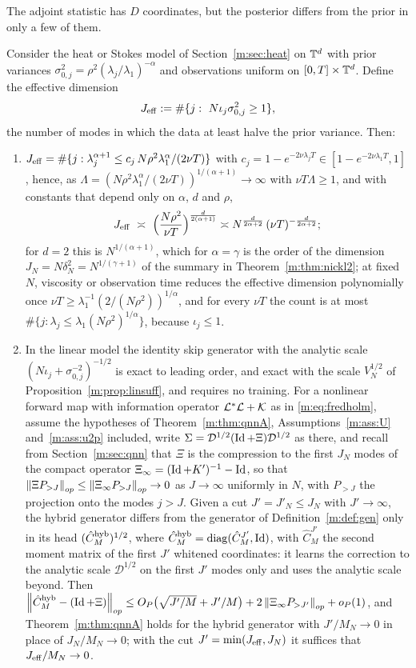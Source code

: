 The adjoint statistic has $D$ coordinates, but the posterior differs from the prior in only a few of them.

\begin{theorem}\label{m:thm:jeff}
Consider the heat or Stokes model of Section~\ref{m:sec:heat} on $\mathbb{T}^d$ with prior variances $\sigma_{0,j}^2=\rho^2(\lambda_j/\lambda_1)^{-\alpha}$ and observations uniform on $[0,T]\times\mathbb{T}^d$. Define the effective dimension
\[
J_{\rm eff}:=\#\{j:\ N\iota_j\sigma_{0,j}^2\ge1\},
\]
the number of modes in which the data at least halve the prior variance. Then:
\begin{enumerate}[label=(\roman*),nosep]
\item $J_{\rm eff}=\#\{j:\lambda_j^{\alpha+1}\le c_j\,N\rho^2\lambda_1^\alpha/(2\nu T)\}$ with $c_j=1-e^{-2\nu\lambda_jT}\in[1-e^{-2\nu\lambda_1T},1]$, hence, as $\Lambda=(N\rho^2\lambda_1^\alpha/(2\nu T))^{1/(\alpha+1)}\to\infty$ with $\nu T\Lambda\ge1$, and with constants that depend only on $\alpha$, $d$ and $\rho$,
\[
J_{\rm eff}\ \asymp\ \Big(\frac{N\rho^2}{\nu T}\Big)^{\frac{d}{2(\alpha+1)}}\asymp N^{\frac{d}{2\alpha+2}}\,(\nu T)^{-\frac{d}{2\alpha+2}} ;
\]
for $d=2$ this is $N^{1/(\alpha+1)}$, which for $\alpha=\gamma$ is the order of the dimension $J_N=N\delta_N^2=N^{1/(\gamma+1)}$ of the summary in Theorem~\ref{m:thm:nickl2}; at fixed $N$, viscosity or observation time reduces the effective dimension polynomially once $\nu T\ge\lambda_1^{-1}(2/(N\rho^2))^{1/\alpha}$, and for every $\nu T$ the count is at most $\#\{j:\lambda_j\le\lambda_1(N\rho^2)^{1/\alpha}\}$, because $\iota_j\le1$.
\item In the linear model the identity skip generator with the analytic scale $(N\iota_j+\sigma_{0,j}^{-2})^{-1/2}$ is exact to leading order, and exact with the scale $V_N^{1/2}$ of Proposition~\ref{m:prop:linsuff}, and requires no training. For a nonlinear forward map with information operator $\mathcal{L}^*\mathcal{L}+\mathcal{K}$ as in \eqref{m:eq:fredholm}, assume the hypotheses of Theorem~\ref{m:thm:qnnA}, Assumptions~\ref{m:ass:U} and~\ref{m:ass:u2p} included, write $\Sigma=\mathcal D^{1/2}(\operatorname{Id}+\Xi)\mathcal D^{1/2}$ as there, and recall from Section~\ref{m:sec:qnn} that $\Xi$ is the compression to the first $J_N$ modes of the compact operator $\Xi_\infty=(\operatorname{Id}+K')^{-1}-\operatorname{Id}$, so that $\left\|\Xi P_{>J}\right\|_{op}\le\left\|\Xi_\infty P_{>J}\right\|_{op}\to0$ as $J\to\infty$ uniformly in $N$, with $P_{>J}$ the projection onto the modes $j>J$. Given a cut $J'=J'_N\le J_N$ with $J'\to\infty$, the hybrid generator differs from the generator of Definition~\ref{m:def:gen} only in its head $(\hat C^{\rm hyb}_M)^{1/2}$, where $\hat C^{\rm hyb}_M=\operatorname{diag}(\hat C^{J'}_M,\operatorname{Id})$, with $\hat C^{J'}_M$ the second moment matrix of the first $J'$ whitened coordinates: it learns the correction to the analytic scale $\mathcal D^{1/2}$ on the first $J'$ modes only and uses the analytic scale beyond. Then $\left\|\hat C^{\rm hyb}_M-(\operatorname{Id}+\Xi)\right\|_{op}\le O_P\big(\sqrt{J'/M}+J'/M\big)+2\left\|\Xi_\infty P_{>J'}\right\|_{op}+o_P(1)$, and Theorem~\ref{m:thm:qnnA} holds for the hybrid generator with $J'/M_N\to0$ in place of $J_N/M_N\to0$; with the cut $J'=\min(J_{\rm eff},J_N)$ it suffices that $J_{\rm eff}/M_N\to0$.

\end{enumerate}
\end{theorem}
